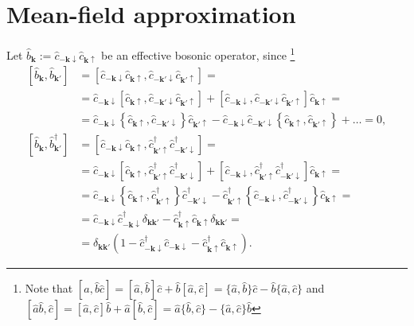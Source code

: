\documentclass[english, parskip=full]{scrartcl}
\newcommand{\kla}{}
\newcommand{\klam}{}
\begin{document}
\section{Mean-field approximation}
Let $\hat{b}_{\mathbf{k}} := \hat{c}_{-\mathbf{k}\downarrow} \hat{c}_{\mathbf{k}\uparrow}$ be an effective bosonic operator, since
\footnote{Note that $[\hat{a},\hat{b}\hat{c}] = [\hat{a},\hat{b}]\hat{c} + \hat{b}[\hat{a},\hat{c}] = \{\hat{a},\hat{b}\}\hat{c} - \hat{b}\{\hat{a},\hat{c}\} $ and $[ \hat{a}\hat{b}, \hat{c} ] = [ \hat{a}, \hat{c} ]\hat{b} + \hat{a}[ \hat{b}, \hat{c} ] = \hat{a} \{\hat{b}, \hat{c} \} -  \{\hat{a}, \hat{c} \} \hat{b}$}
\begin{align}
\klam\left[ \hat{b}_{\mathbf{k}}, \hat{b}_{\mathbf{k}'} \right] &= \klam\left[ \hat{c}_{-\mathbf{k}\downarrow} \hat{c}_{\mathbf{k}\uparrow},  \hat{c}_{-\mathbf{k}'\downarrow} \hat{c}_{\mathbf{k}'\uparrow}   \right] = \\
&= \hat{c}_{-\mathbf{k}\downarrow} \klam\left[ \hat{c}_{\mathbf{k}\uparrow},  \hat{c}_{-\mathbf{k}'\downarrow} \hat{c}_{\mathbf{k}'\uparrow}   \right] + \klam\left[ \hat{c}_{-\mathbf{k}\downarrow},  \hat{c}_{-\mathbf{k}'\downarrow} \hat{c}_{\mathbf{k}'\uparrow}   \right] \hat{c}_{\mathbf{k}\uparrow} = \\
&= \hat{c}_{-\mathbf{k}\downarrow} \klam\left\{ \hat{c}_{\mathbf{k}\uparrow},  \hat{c}_{-\mathbf{k}'\downarrow}  \right\} \hat{c}_{\mathbf{k}'\uparrow} - \hat{c}_{-\mathbf{k}\downarrow} \hat{c}_{-\mathbf{k}'\downarrow} \klam\left\{ \hat{c}_{\mathbf{k}\uparrow},  \hat{c}_{\mathbf{k}'\uparrow}   \right\} + \dots = 0,\\
\klam\left[ \hat{b}_{\mathbf{k}}, \hat{b}_{\mathbf{k}'}^\dagger \right] &= \klam\left[ \hat{c}_{-\mathbf{k}\downarrow} \hat{c}_{\mathbf{k}\uparrow},  \hat{c}_{\mathbf{k}'\uparrow}^\dagger \hat{c}_{-\mathbf{k}'\downarrow}^\dagger  \right] = \\
&= \hat{c}_{-\mathbf{k}\downarrow} \klam\left[  \hat{c}_{\mathbf{k}\uparrow},  \hat{c}_{\mathbf{k}'\uparrow}^\dagger \hat{c}_{-\mathbf{k}'\downarrow}^\dagger  \right] + \klam\left[ \hat{c}_{-\mathbf{k}\downarrow} ,  \hat{c}_{\mathbf{k}'\uparrow}^\dagger \hat{c}_{-\mathbf{k}'\downarrow}^\dagger  \right] \hat{c}_{\mathbf{k}\uparrow} = \\
&= \hat{c}_{-\mathbf{k}\downarrow} \klam\left\{  \hat{c}_{\mathbf{k}\uparrow},  \hat{c}_{\mathbf{k}'\uparrow}^\dagger   \right\} \hat{c}_{-\mathbf{k}'\downarrow}^\dagger -  \hat{c}_{\mathbf{k}'\uparrow}^\dagger \klam\left\{ \hat{c}_{-\mathbf{k}\downarrow} ,  \hat{c}_{-\mathbf{k}'\downarrow}^\dagger  \right\} \hat{c}_{\mathbf{k}\uparrow} = \\
&= \hat{c}_{-\mathbf{k}\downarrow} \hat{c}_{-\mathbf{k}\downarrow}^\dagger \delta_{\mathbf{k}\mathbf{k}'} - \hat{c}_{\mathbf{k}\uparrow}^\dagger \hat{c}_{\mathbf{k}\uparrow} \delta_{\mathbf{k}\mathbf{k}'} = \\
&= \delta_{\mathbf{k}\mathbf{k}'} \kla\left( 1 - \hat{c}_{-\mathbf{k}\downarrow}^\dagger \hat{c}_{-\mathbf{k}\downarrow} - \hat{c}_{\mathbf{k}\uparrow}^\dagger \hat{c}_{\mathbf{k}\uparrow} \right).
\end{align}
\end{document}
